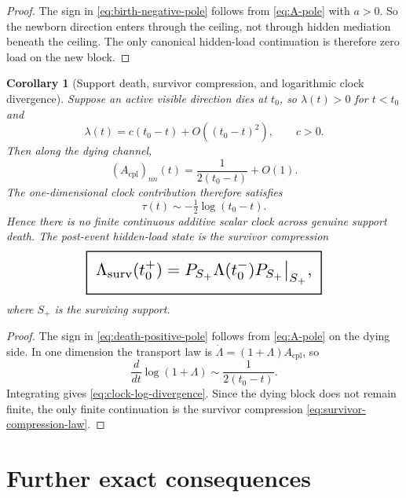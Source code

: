 \documentclass[11pt,a4paper]{article}
\numberwithin{equation}{section}
\newcommand{\geomboxed}[1]{%
  \setlength{\fboxsep}{8pt}%
  \setlength{\fboxrule}{0.9pt}%
  \fbox{\scalebox{1.5}{$\displaystyle #1$}}%
}
\theoremstyle{thmcompact}
\newtheorem{corollary}[theorem]{Corollary}
\theoremstyle{remark}
\begin{document}
\begin{proof}
The sign in \eqref{eq:birth-negative-pole} follows from \eqref{eq:A-pole} with $a>0$. So the newborn direction enters through the ceiling, not through hidden mediation beneath the ceiling. The only canonical hidden-load continuation is therefore zero load on the new block.
\end{proof}

\begin{corollary}[Support death, survivor compression, and logarithmic clock divergence]
\label{cor:support-death}
Suppose an active visible direction dies at $t_0$, so $\lambda(t)>0$ for $t<t_0$ and
\[
\lambda(t)=c(t_0-t)+O((t_0-t)^2),
\qquad c>0.
\]
Then along the dying channel,
\begin{equation}
(A_{\mathrm{cpl}})_{nn}(t)=\frac{1}{2(t_0-t)}+O(1).
\label{eq:death-positive-pole}
\end{equation}
The one-dimensional clock contribution therefore satisfies
\begin{equation}
\boxed{
\tau(t)\sim -\tfrac12\log(t_0-t).
}
\label{eq:clock-log-divergence}
\end{equation}
Hence there is no finite continuous additive scalar clock across genuine support death. The post-event hidden-load state is the survivor compression
\begin{equation}
\geomboxed{
\Lambda_{\mathrm{surv}}(t_0^+)
=
P_{S_+}\Lambda(t_0^-)P_{S_+}\big|_{S_+},
}
\label{eq:survivor-compression-law}
\end{equation}
where $S_+$ is the surviving support.
\end{corollary}

\begin{proof}
The sign in \eqref{eq:death-positive-pole} follows from \eqref{eq:A-pole} on the dying side. In one dimension the transport law is $\dot\Lambda=(1+\Lambda)A_{\mathrm{cpl}}$, so
\[
\frac{d}{dt}\log(1+\Lambda)\sim \frac{1}{2(t_0-t)}.
\]
Integrating gives \eqref{eq:clock-log-divergence}. Since the dying block does not remain finite, the only finite continuation is the survivor compression \eqref{eq:survivor-compression-law}.
\end{proof}

\section{Further exact consequences}
\end{document}
